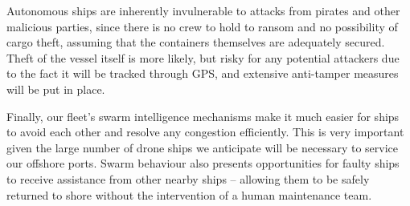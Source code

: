 Autonomous ships are inherently invulnerable to attacks from pirates and other malicious parties, since there is no crew to hold to ransom and no possibility of cargo theft, assuming that the containers themselves are adequately secured. Theft of the vessel itself is more likely, but risky for any potential attackers due to the fact it will be tracked through GPS, and extensive anti-tamper measures will be put in place.

Finally, our fleet’s swarm intelligence mechanisms make it much easier for ships to avoid each other and resolve any congestion efficiently. This is very important given the large number of drone ships we anticipate will be necessary to service our offshore ports. Swarm behaviour also presents opportunities for faulty ships to receive assistance from other nearby ships -- allowing them to be safely returned to shore without the intervention of a human maintenance team.
